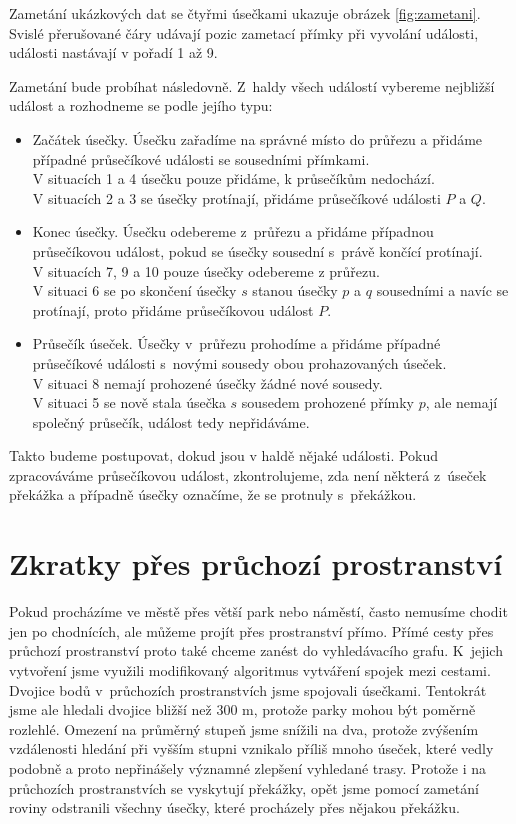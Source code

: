 Zametání ukázkových dat se čtyřmi úsečkami ukazuje obrázek \ref{fig:zametani}.
Svislé přerušované čáry udávají pozic zametací přímky při vyvolání události,
události nastávají v pořadí 1 až 9.

Zametání bude probíhat následovně. Z~haldy všech událostí vybereme nejbližší
událost a rozhodneme se podle jejího typu:
\begin{itemize}
	\item {\tuc Začátek úsečky.}  Úsečku zařadíme na správné místo do
	průřezu a přidáme případné průsečíkové události se sousedními
	přímkami.\\
	V situacích 1 a 4 úsečku pouze přidáme, k průsečíkům nedochází.\\
	V situacích 2 a 3 se úsečky protínají, přidáme průsečíkové události
	$P$ a $Q$.

	\item {\tuc Konec úsečky.} Úsečku odebereme z~průřezu a přidáme
	případnou průsečíkovou událost, pokud se úsečky sousední s~právě
	končící protínají.\\
	V situacích 7, 9 a 10 pouze úsečky odebereme z průřezu.\\
	V situaci 6 se po skončení úsečky $s$ stanou úsečky $p$ a $q$ sousedními
	a navíc se protínají, proto přidáme průsečíkovou událost $P$.
	\item {\tuc Průsečík úseček.} Úsečky v~průřezu prohodíme a přidáme
	případné průsečíkové události s~novými sousedy obou prohazovaných 
	úseček.\\
	V situaci 8 nemají prohozené úsečky žádné nové sousedy.\\
	V situaci 5 se nově stala úsečka $s$ sousedem prohozené přímky $p$, ale
	nemají společný průsečík, událost tedy nepřidáváme.
\end{itemize}
Takto budeme postupovat, dokud jsou v haldě nějaké události. Pokud zpracováváme 
průsečíkovou událost, zkontrolujeme, zda není některá z~úseček překážka a 
případně úsečky označíme, že se protnuly s~překážkou. 


\section{Zkratky přes průchozí prostranství}
Pokud procházíme ve městě přes větší park nebo náměstí, často nemusíme chodit
jen po chodnících, ale můžeme projít přes prostranství přímo. Přímé cesty přes
průchozí prostranství proto také chceme zanést do vyhledávacího grafu. K~jejich
vytvoření jsme využili modifikovaný algoritmus vytváření spojek mezi cestami.
Dvojice bodů v~průchozích prostranstvích jsme spojovali úsečkami. Tentokrát jsme
ale hledali dvojice bližší než 300 m, protože parky mohou být poměrně rozlehlé.
Omezení na průměrný stupeň jsme snížili na dva, protože zvýšením vzdálenosti
hledání při vyšším stupni vznikalo příliš mnoho úseček, které vedly podobně a
proto nepřinášely významné zlepšení vyhledané trasy. Protože i na průchozích
prostranstvích se vyskytují překážky, opět jsme pomocí zametání roviny
odstranili všechny úsečky, které procházely přes nějakou překážku.

